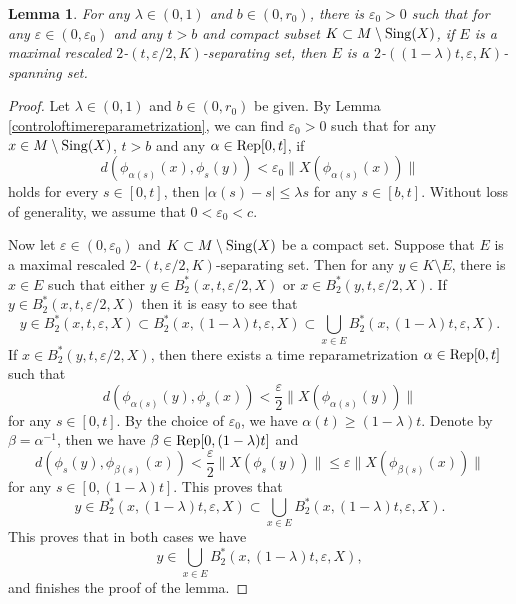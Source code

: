 \documentclass[10pt]{article}
\newtheorem*{Theorem A}{Theorem A}
\newtheorem{Lemma}[Theorem]{Lemma}
\begin{document}
\begin{Lemma}\label{lemma5.3}
For any $\lambda\in(0,1)$ and $b\in(0, r_0)$, there is $\varepsilon_0>0$ such that for any $\varepsilon\in(0, \varepsilon_0)$ and any $t>b$ and compact subset $K\subset M\setminus{\rm Sing}(X)$, if $E$ is a maximal rescaled $2$-$(t, \varepsilon/2, K)$-separating set, then $E$ is a $2$-$((1-\lambda)t, \varepsilon, K)$-spanning set.
\end{Lemma}
\begin{proof}
Let $\lambda\in(0,1)$ and $b\in(0, r_0)$ be given. By Lemma \ref{controloftimereparametrization}, we can find $\varepsilon_0>0$ such that for any $x\in M\setminus{\rm Sing}(X)$, $t>b$ and any $\alpha\in {\rm Rep}[0, t]$, if
$$d(\phi_{\alpha(s)}(x), \phi_s(y))<\varepsilon_0\|X(\phi_{\alpha(s)}(x))\|$$
holds for every $s\in[0, t]$, then $|\alpha(s)-s| \leq \lambda s$ for any $s\in[b, t]$. Without loss of generality, we assume that $0<\varepsilon_0<c$.

Now let $\varepsilon\in(0, \varepsilon_0)$ and $K\subset M\setminus{\rm Sing}(X)$ be a compact set. Suppose that $E$ is a maximal rescaled 2-$(t, \varepsilon/2, K)$-separating set. Then for any $y\in K\setminus E$, there is $x\in E$ such that either $y\in B_2^*(x, t, \varepsilon/2, X)$ or $x\in B_2^*(y, t, \varepsilon/2, X)$. If $y\in B_2^*(x, t, \varepsilon/2, X)$ then it is easy to see that
$$y\in B_2^*(x, t, \varepsilon, X)\subset B_2^*(x, (1-\lambda)t, \varepsilon, X)\subset\bigcup_{x\in E} B_2^*(x, (1-\lambda)t, \varepsilon, X).$$
If $x\in B_2^*(y, t, \varepsilon/2, X)$, then there exists a time reparametrization $\alpha\in {\rm Rep}[0, t]$ such that
$$d(\phi_{\alpha(s)}(y), \phi_s(x))<\frac{\varepsilon}{2}\|X(\phi_{\alpha(s)}(y))\|$$
for any $s\in[0,t]$. By the choice of $\varepsilon_0$, we have $\alpha(t)\geq (1-\lambda)t$. Denote by $\beta=\alpha^{-1}$, then we have $\beta\in {\rm Rep}[0, (1-\lambda)t]$ and
$$d(\phi_s(y), \phi_{\beta(s)}(x))<\frac{\varepsilon}{2}\|X(\phi_s(y))\|\leq \varepsilon\|X(\phi_{\beta(s)}(x))\|$$
for any $s\in[0, (1-\lambda)t]$. This proves that
$$y\in B_2^*(x, (1-\lambda)t, \varepsilon, X)\subset \bigcup_{x\in E} B_2^*(x, (1-\lambda)t, \varepsilon, X).$$ This proves that in both cases we have
$$y\in\bigcup_{x\in E} B_2^*(x, (1-\lambda)t, \varepsilon, X),$$
and finishes the proof of the lemma.
\end{proof}
\end{document}

